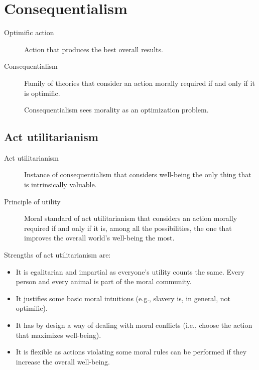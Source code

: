 \section{Consequentialism}

\begin{description}
    \item[Optimific action] 
        Action that produces the best overall results.

    \item[Consequentialism] 
        Family of theories that consider an action morally required if and only if it is optimific.

        \begin{remark}
            Consequentialism sees morality as an optimization problem.
        \end{remark}
\end{description}


\subsection{Act utilitarianism}

\begin{description}
    \item[Act utilitarianism] 
        Instance of consequentialism that considers well-being the only thing that is intrinsically valuable.

    \item[Principle of utility] 
        Moral standard of act utilitarianism that considers an action morally required if and only if it is, among all the possibilities, the one that improves the overall world's well-being the most.
\end{description}

\begin{remark}
    Strengths of act utilitarianism are:
    \begin{itemize}
        \item It is egalitarian and impartial as everyone's utility counts the same. Every person and every animal is part of the moral community.
        \item It justifies some basic moral intuitions (e.g., slavery is, in general, not optimific).
        \item It has by design a way of dealing with moral conflicts (i.e., choose the action that maximizes well-being).
        \item It is flexible as actions violating some moral rules can be performed if they increase the overall well-being.
    \end{itemize}
\end{remark}

